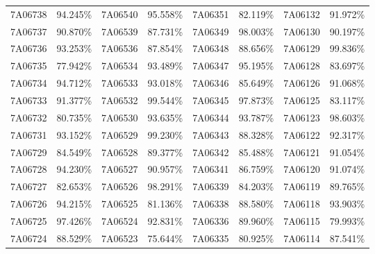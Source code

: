 \documentclass[12pt]{article}%
\begin{document}
\begin{longtable}{|cc|cc|cc|cc|}
7A06738              & 94.245\% & 7A06540              & 95.558\% & 7A06351              & 82.119\% & \multicolumn{1}{l}{7A06132             } & 91.972\% \\
7A06737              & 90.870\% & 7A06539              & 87.731\% & 7A06349              & 98.003\% & \multicolumn{1}{l}{7A06130             } & 90.197\% \\
7A06736              & 93.253\% & 7A06536              & 87.854\% & 7A06348              & 88.656\% & \multicolumn{1}{l}{7A06129             } & 99.836\% \\
7A06735              & 77.942\% & 7A06534              & 93.489\% & 7A06347              & 95.195\% & \multicolumn{1}{l}{7A06128             } & 83.697\% \\
7A06734              & 94.712\% & 7A06533              & 93.018\% & 7A06346              & 85.649\% & \multicolumn{1}{l}{7A06126             } & 91.068\% \\
7A06733              & 91.377\% & 7A06532              & 99.544\% & 7A06345              & 97.873\% & \multicolumn{1}{l}{7A06125             } & 83.117\% \\
7A06732              & 80.735\% & 7A06530              & 93.635\% & 7A06344              & 93.787\% & \multicolumn{1}{l}{7A06123             } & 98.603\% \\
7A06731              & 93.152\% & 7A06529              & 99.230\% & 7A06343              & 88.328\% & \multicolumn{1}{l}{7A06122             } & 92.317\% \\
7A06729              & 84.549\% & 7A06528              & 89.377\% & 7A06342              & 85.488\% & \multicolumn{1}{l}{7A06121             } & 91.054\% \\
7A06728              & 94.230\% & 7A06527              & 90.957\% & 7A06341              & 86.759\% & \multicolumn{1}{l}{7A06120             } & 91.074\% \\
7A06727              & 82.653\% & 7A06526              & 98.291\% & 7A06339              & 84.203\% & \multicolumn{1}{l}{7A06119             } & 89.765\% \\
7A06726              & 94.215\% & 7A06525              & 81.136\% & 7A06338              & 88.580\% & \multicolumn{1}{l}{7A06118             } & 93.903\% \\
7A06725              & 97.426\% & 7A06524              & 92.831\% & 7A06336              & 89.960\% & \multicolumn{1}{l}{7A06115             } & 79.993\% \\
7A06724              & 88.529\% & 7A06523              & 75.644\% & 7A06335              & 80.925\% & \multicolumn{1}{l}{7A06114             } & 87.541\% \\

\end{longtable}
\end{document}
